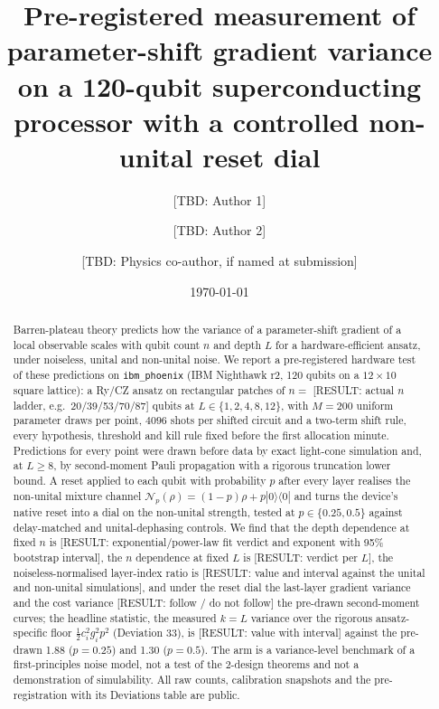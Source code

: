 \documentclass[aps,prxquantum,reprint,superscriptaddress,nofootinbib,longbibliography,amsmath,amssymb]{revtex4-2}
\newcommand{\placeholder}[1]{\textcolor{red!70!black}{[RESULT: #1]}}
\newcommand{\tbd}[1]{\textcolor{orange!80!black}{[TBD: #1]}}
\newcommand{\Np}{\mathcal{N}_p}
\begin{document}
\title{Pre-registered measurement of parameter-shift gradient variance on a 120-qubit superconducting processor with a controlled non-unital reset dial}

\author{\tbd{Author 1}}
\author{\tbd{Author 2}}
\author{\tbd{Physics co-author, if named at submission}}
\affiliation{\tbd{affiliation}}

\date{\today}

\begin{abstract}
Barren-plateau theory predicts how the variance of a parameter-shift gradient of a local observable scales with qubit count $n$ and depth $L$ for a hardware-efficient ansatz, under noiseless, unital and non-unital noise. We report a pre-registered hardware test of these predictions on \texttt{ibm\_phoenix} (IBM Nighthawk r2, 120 qubits on a $12\times10$ square lattice): a Ry/CZ ansatz on rectangular patches of $n = $ \placeholder{actual $n$ ladder, e.g.\ 20/39/53/70/87} qubits at $L \in \{1, 2, 4, 8, 12\}$, with $M = 200$ uniform parameter draws per point, $4096$ shots per shifted circuit and a two-term shift rule, every hypothesis, threshold and kill rule fixed before the first allocation minute. Predictions for every point were drawn before data by exact light-cone simulation and, at $L \geq 8$, by second-moment Pauli propagation with a rigorous truncation lower bound. A reset applied to each qubit with probability $p$ after every layer realises the non-unital mixture channel $\Np(\rho) = (1-p)\rho + p|0\rangle\langle 0|$ and turns the device's native reset into a dial on the non-unital strength, tested at $p \in \{0.25, 0.5\}$ against delay-matched and unital-dephasing controls. We find that the depth dependence at fixed $n$ is \placeholder{exponential/power-law fit verdict and exponent with 95\% bootstrap interval}, the $n$ dependence at fixed $L$ is \placeholder{verdict per $L$}, the noiseless-normalised layer-index ratio is \placeholder{value and interval against the unital and non-unital simulations}, and under the reset dial the last-layer gradient variance and the cost variance \placeholder{follow / do not follow} the pre-drawn second-moment curves; the headline statistic, the measured $k = L$ variance over the rigorous ansatz-specific floor $\tfrac12 c_i^2 g_i^2 p^2$ (Deviation 33), is \placeholder{value with interval} against the pre-drawn 1.88 ($p = 0.25$) and 1.30 ($p = 0.5$). The arm is a variance-level benchmark of a first-principles noise model, not a test of the 2-design theorems and not a demonstration of simulability. All raw counts, calibration snapshots and the pre-registration with its Deviations table are public.
\end{abstract}
\end{document}
